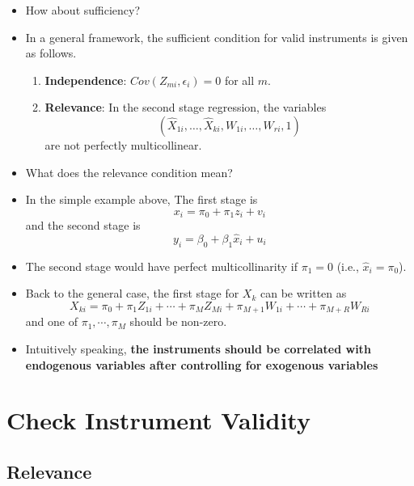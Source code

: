 \documentclass[]{book}
\providecommand{\tightlist}{%
  \setlength{\itemsep}{0pt}\setlength{\parskip}{0pt}}
\begin{document}
\begin{itemize}
\tightlist
\item
  How about sufficiency?
\item
  In a general framework, the sufficient condition for valid instruments
  is given as follows.

  \begin{enumerate}
  \def\labelenumi{\arabic{enumi}.}
  \tightlist
  \item
    \textbf{Independence}: \(Cov( Z_{mi}, \epsilon_i) = 0\) for all
    \(m\).
  \item
    \textbf{Relevance}: In the second stage regression, the variables \[
    \left( \widehat{X}_{1i},\dots,\widehat{X}_{ki}, W_{1i},\dots,W_{ri}, 1 \right)
    \] are not perfectly multicollinear.
  \end{enumerate}
\item
  What does the relevance condition mean?
\item
  In the simple example above, The first stage is\\
  \[
  x_i = \pi_0 + \pi_1 z_i + v_i
  \] and the second stage is \[
  y_i = \beta_0 + \beta_1 \widehat{x}_i + u_i
  \]
\item
  The second stage would have perfect multicollinarity if \(\pi_1 = 0\)
  (i.e., \(\widehat{x}_i = \pi_0\)).
\item
  Back to the general case, the first stage for \(X_k\) can be written
  as \[
  X_{ki} = \pi_0 + \pi_1 Z_{1i} + \cdots + \pi_M Z_{Mi} + \pi_{M+1} W_{1i} + \cdots + \pi_{M+R} W_{Ri}
  \] and one of \(\pi_1 , \cdots, \pi_M\) should be non-zero.
\item
  Intuitively speaking, \textbf{the instruments should be correlated
  with endogenous variables after controlling for exogenous variables}
\end{itemize}

\section{Check Instrument Validity}\label{check-instrument-validity}

\subsection{Relevance}\label{relevance}
\end{document}
